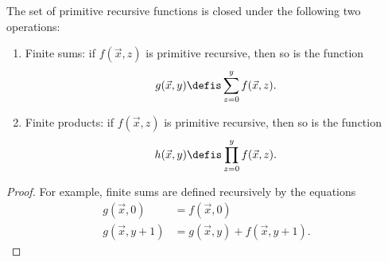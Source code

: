 \documentclass[../../../include/open-logic-section]{subfiles}
\begin{document}
\begin{prop}
The set of primitive recursive functions is closed under the
following two operations:
\begin{enumerate}
\item Finite sums: if $f(\vec x, z)$ is primitive recursive, then so
is the function
\[
g(\vec x, y) \defis \sum_{z = 0}^y f(\vec x, z).
\]
\item Finite products: if $f(\vec x, z)$ is primitive recursive, then
so is the function
\[
h(\vec x, y) \defis \prod_{z = 0}^y f(\vec x, z).
\]
\end{enumerate}
\end{prop}

\begin{proof}
For example, finite sums are defined recursively by the equations
\begin{align*}
  g(\vec x, 0) & = f(\vec x, 0)\\
  g(\vec x, y+1) & = g(\vec x, y) + f(\vec x, y+1).
\end{align*}
\end{proof}
\end{document}
